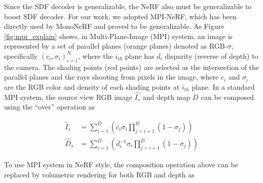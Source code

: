 Since the SDF decoder is generalizable, the NeRF also must be generalizable to boost SDF decoder. For our work, we adopted MPI-NeRF\cite{mpi, mpi-nerf}, which has been directly used by MonoNeRF\cite{mononerf} and proved to be generalizable. As Figure \ref{fig:mpi_explain} shows, in Multi-Plane-Image (MPI) system, an image is represented by a set of parallel planes (orange planes) denoted as RGB-$\sigma$, specifically $(c_{i}, \sigma_{i})_{i=1}^N$,  where the $i_{th}$ plane has $d_{i}$ disparity (reverse of depth) to the camera. The shading points (red points) are selected as the intersection of the parallel planes and the rays shooting from pixels in the image, where $c_{i}$ and $\sigma_{i}$ are the RGB color and density of each shading points at $i_{th}$ plane. In a standard MPI system, the source view RGB image $\hat{I_{s}}$ and depth map $\hat{D_{}}$ can be composed using the ``over'' operation \cite{over_composite} as

{
\begin{equation}
\begin{aligned}
    \hat{I}_s &= \sum_{i=1}^{D} (c_i \sigma_i \prod_{j=i+1}^{D} (1 - \sigma_j)) \\
    \hat{D}_s &= \sum_{i=1}^{D} (d_i^{-1} \sigma_i \prod_{j=i+1}^{D} (1 - \sigma_j))
\end{aligned}
\label{eq:combined}
\end{equation}
}

To use MPI system in NeRF style, the composition operation above can be replaced by volumetric rendering \cite{nerf} for both RGB and depth as 


